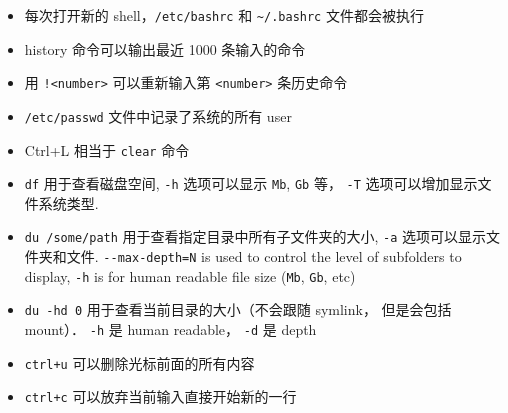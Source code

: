 \begin{itemize}
\item 每次打开新的 shell，\verb`/etc/bashrc` 和 \verb`~/.bashrc` 文件都会被执行
\item history 命令可以输出最近 1000 条输入的命令
\item 用 \verb`!<number>` 可以重新输入第 \verb`<number>` 条历史命令
\item \verb`/etc/passwd` 文件中记录了系统的所有 user
\item Ctrl+L 相当于 \verb`clear` 命令
\item \verb`df` 用于查看磁盘空间, \verb`-h` 选项可以显示 \verb`Mb`, \verb`Gb` 等， \verb|-T| 选项可以增加显示文件系统类型.
\item \verb`du /some/path` 用于查看指定目录中所有子文件夹的大小, \verb`-a` 选项可以显示文件夹和文件. \verb`--max-depth=N` is used to control the level of subfolders to display, \verb`-h` is for human readable file size (\verb`Mb`, \verb`Gb`, etc)
\item \verb|du -hd 0| 用于查看当前目录的大小（不会跟随 symlink， 但是会包括 mount）． \verb|-h| 是 human readable， \verb|-d| 是 depth
\item \verb`ctrl+u` 可以删除光标前面的所有内容
\item \verb`ctrl+c` 可以放弃当前输入直接开始新的一行
\end{itemize}

